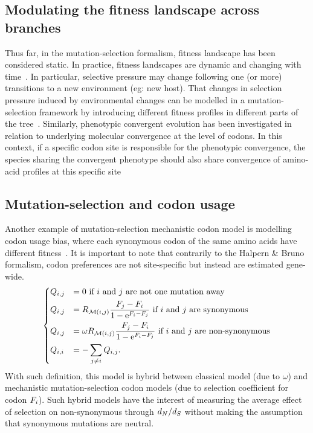 \subsection{Modulating the fitness landscape across branches}
\label{subsec:modulating-the-fitness-landscape-across-branches}

Thus far, in the mutation-selection formalism, fitness landscape has been considered static.
In practice, fitness landscapes are dynamic and changing with time~\citep{Naumenko2012, Bazykin2015}.
In particular, selective pressure may change following one (or more) transitions to a new environment (eg: new host).
That changes in selection pressure induced by environmental changes can be modelled in a mutation-selection framework by introducing different fitness profiles in different parts of the tree~\citep{Tamuri2009}.
Similarly, phenotypic convergent evolution has been investigated in relation to underlying molecular convergence at the level of codons.
In this context, if a specific codon site is responsible for the phenotypic convergence, the species sharing the convergent phenotype should also share convergence of amino-acid profiles at this specific site~\citep{Parto2018,Parto2018a}

\subsection{Mutation-selection and codon usage}
\label{subsec:model-codon-usage}

Another example of mutation-selection mechanistic codon model is modelling codon usage bias, where each synonymous codon of the same amino acids have different fitness~\citep{Yang2008}.
It is important to note that contrarily to the Halpern \& Bruno formalism, codon preferences are not site-specific but instead are estimated gene-wide.
\begin{equation}
    \begin{dcases}
        Q_{{i}, {j}} & = 0 \text{ if ${i}$ and ${j}$ are not one mutation away} \\
        Q_{{i}, {j}} & = R_{\mathcal{M}({i}, {j})} \dfrac{F_{{j}} - F_{{i}}}{1 - \mathrm{e}^{F_{{i}} - F_{{j}}} }\text{ if ${i}$ and ${j}$ are synonymous} \\
        Q_{{i}, {j}} & = \omega R_{\mathcal{M}({i}, {j})} \dfrac{F_{{j}} - F_{{i}}}{1 - \mathrm{e}^{F_{{i}} - F_{{j}}} } \text{ if ${i}$ and ${j}$ are non-synonymous} \\
        Q_{{i}, {i}} & = - \sum\limits_{{j} \neq {i}} Q_{{i}, {j}}.
    \end{dcases}
    \label{eq:yang-codon-models}
\end{equation}
With such definition, this model is hybrid between classical model (due to $\omega$) and mechanistic mutation-selection codon models (due to selection coefficient for codon $F_{{i}}$).
Such hybrid models have the interest of measuring the average effect of selection on non-synonymous through $d_N / d_S$ without making the assumption that synonymous mutations are neutral.


